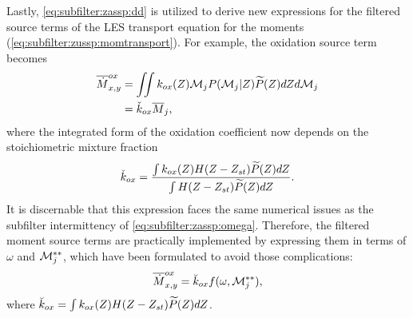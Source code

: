 Lastly, \cref{eq:subfilter:zassp:dd} is utilized to derive new expressions for the filtered source terms of the LES transport equation for the moments (\cref{eq:subfilter:zussp:momtransport}). For example, the oxidation source term becomes
\begin{equation}\label{eq:subfilter:zassp:ox}
  \begin{split}
    \fst[M]{x,y}^{ox} &= \iint k_{ox}(Z)\mc{M}_j P(\mc{M}_j|Z)\pz dZ d\mc{M}_j \\
    &= \check{k}_{ox}\mean{M}_j,
  \end{split}
\end{equation}
where the integrated form of the oxidation coefficient now depends on the stoichiometric mixture fraction
\begin{equation}\label{eq:subfilter:zassp:kox}
  \check{k}_{ox} = \frac{\int k_{ox}(Z)H(Z - Z_{st})\pz dZ}{\int H(Z - Z_{st})\pz dZ}.
\end{equation}
It is discernable that this expression faces the same numerical issues as the subfilter intermittency of \cref{eq:subfilter:zassp:omega}. Therefore, the filtered moment source terms are practically implemented by expressing them in terms of $\omega$ and $\mc{M}_j^{**}$, which have been formulated to avoid those complications:
\begin{equation}\label{eq:subfilter:zassp:practicalox}
  \fst[M]{x,y}^{ox} = \breve{k}_{ox}f(\omega,\mc{M}_j^{**}),
\end{equation}
where $\breve{k}_{ox} = \int k_{ox}(Z)H(Z - Z_{st})\pz dZ$.
